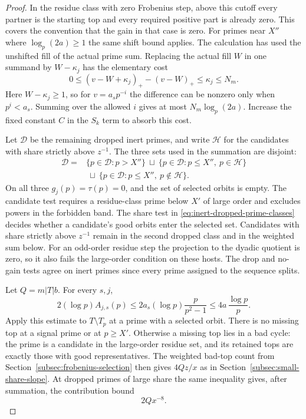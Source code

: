 \begin{proof}
In the residue class with zero Frobenius step, above this cutoff
every partner is the starting top and every required positive
part is already zero. This covers the convention that the gain
in that case is zero. For primes near \(X''\) where
\(\log_p(2a)\ge1\) the same shift bound applies.
The calculation has used the unshifted fill of the actual prime sum.
Replacing the actual fill \(W\) in one summand by \(W-\kappa_j\)
has the elementary cost
\[
 0\le (v-W+\kappa_j)_+-(v-W)_+\le\kappa_j\le N_m .
\]
Here \(W-\kappa_j\ge1\), so for \(v=a_sp^{-i}\) the
difference can be nonzero only when \(p^i<a_s\). Summing over
the allowed \(i\) gives at most \(N_m\log_p(2a)\). Increase the
fixed constant \(C\) in the \(S_k\) term to absorb this cost.
\label{cor:prime-class-loss-2}

Let \(\mathcal D\) be the remaining dropped inert primes, and
write \(\mathcal H\) for the candidates with share strictly above
\(z^{-1}\). The three sets used in the summation are disjoint:
\begin{equation}\label{eq:inert-dropped-prime-classes}
 \begin{aligned}
 \mathcal D
  ={}&\{p\in\mathcal D:p>X''\}
    \ \sqcup\ \{p\in\mathcal D:p\le X'',\ p\in\mathcal H\}\\
   &\ \sqcup\ \{p\in\mathcal D:p\le X'',\ p\notin\mathcal H\}.
 \end{aligned}
\end{equation}
On all three \(g_j(p)=\tau(p)=0\), and the set of selected orbits is empty.
The candidate test requires a residue-class prime below
\(X'\) of large order and excludes powers in the forbidden band.
The share test in \eqref{eq:inert-dropped-prime-classes} decides whether a candidate's good orbits
enter the selected set. Candidates with share strictly above
\(z^{-1}\) remain in the second dropped class and in the weighted
sum below. For an odd-order residue step the
projection to the dyadic quotient is zero, so it also fails the
large-order condition on these hosts. The drop and no-gain tests
agree on inert primes since every prime assigned to the sequence splits.

Let \(Q=m|T|b\). For every \(s,j\),
\[
 2(\log p)A_{j,s}(p)
     \le 2a_s(\log p)\frac{p}{p^2-1}\le4a\,\frac{\log p}{p}.
\]
Apply this estimate to \(T\setminus T_p\) at a prime with a selected orbit.
There is no missing top at a signal prime or at \(p\ge X'\).
Otherwise a missing top lies in a bad cycle: the prime is a
candidate in the large-order residue set, and its retained tops
are exactly those with good representatives. The weighted
bad-top count from Section~\ref{subsec:frobenius-selection} then
gives \(4Qz/x\) as in Section~\ref{subsec:small-share-slope}.
At dropped primes of large share the same inequality gives, after summation, the contribution bound
\[
 2Qx^{-8}.
\]


\end{proof}
